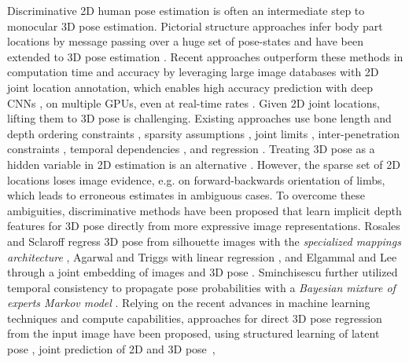 \documentclass[acmtog]{acmart}
\newcommand{\change}[1]{{#1}}
\begin{document}
Discriminative 2D human pose estimation is often an intermediate step to monocular 3D pose estimation. Pictorial structure approaches infer body part locations by
message passing over a huge set of pose-states
\cite{agarwal_recovering_pami06,felzenszwalb_pictorial_ijcv05,ferrari_pose_cvpr2009,andriluka_pictorial_cvpr09,bourdev2009poselets,johnson_lsp_bmvc10} and have been extended to 3D pose estimation \cite{balan_detailed_cvpr2007,sigal_loose_ijcv2012,amin_multi_bmvc2013,belagiannis_3d_cvpr2014}.
Recent approaches outperform these methods in computation time and accuracy by leveraging large image databases with 2D joint location annotation, which enables high accuracy prediction with deep CNNs \cite{hu_bottomup_cvpr16,belagiannis_recurrent_arxiv6,pishchulin_deepcut_cvpr16,insafutdinov_deepercut_eccv16,wei_cpm_cvpr16},
on multiple GPUs, even at real-time rates \cite{cao2016realtime}. 
\change{Given 2D joint locations, lifting them to 3D pose is challenging}. Existing approaches use bone length and depth ordering constraints \cite{taylor_articulated_cvpr00,mori_contexts_pami06},
sparsity assumptions \cite{wang_robust_cvpr2014,zhou_convexrelaxation_cvpr2015,zhou_sparse_arXiv2015},
joint limits \cite{akhter_pose_conditioned_cvpr15},
inter-penetration constraints \cite{bogo_smpl_eccv16},
temporal dependencies \cite{rhodin_general_eccv16},
and
regression \cite{yasin_dual_source_cvpr16}.
Treating 3D pose as a hidden variable in 2D estimation is an alternative \cite{brau_annotations_3dv16}.
However, the sparse set of 2D locations loses image evidence, e.g. on forward-backwards orientation of limbs, which leads to erroneous estimates in ambiguous cases.
To overcome these ambiguities, discriminative methods have been proposed that learn implicit depth features for
3D pose directly from more expressive image representations.
Rosales and Sclaroff regress 3D pose from silhouette images with the \emph{specialized
mappings architecture} ,
Agarwal and Triggs with linear regression ,
and Elgammal and Lee through a joint embedding of images and 3D pose .
Sminchisescu further utilized temporal consistency to propagate pose probabilities with a \emph{Bayesian mixture of experts Markov model} .
\change{Relying on the recent advances in machine learning techniques and compute capabilities, approaches for direct 3D pose regression from the input image have been proposed, 
using structured learning of latent pose}
\cite{tekin_structured_bmvc16,li_maxmargin_iccv15}, joint prediction of 2D and 3D pose~\cite{li_accv14,tekin_fusion_arxiv16,yasin_dual_source_cvpr16},
\end{document}
